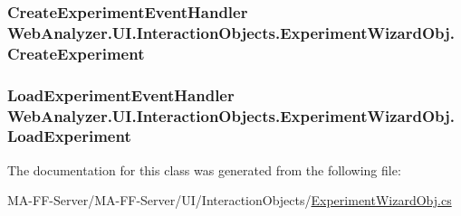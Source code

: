 \subsubsection[{Create\+Experiment}]{\setlength{\rightskip}{0pt plus 5cm}Create\+Experiment\+Event\+Handler Web\+Analyzer.\+U\+I.\+Interaction\+Objects.\+Experiment\+Wizard\+Obj.\+Create\+Experiment}\label{class_web_analyzer_1_1_u_i_1_1_interaction_objects_1_1_experiment_wizard_obj_a95676a614efb19092a4522290e47ef96}
\hypertarget{class_web_analyzer_1_1_u_i_1_1_interaction_objects_1_1_experiment_wizard_obj_a4ab54f4e59198b7ff3e9b91ad5049642}{}
\subsubsection[{Load\+Experiment}]{\setlength{\rightskip}{0pt plus 5cm}Load\+Experiment\+Event\+Handler Web\+Analyzer.\+U\+I.\+Interaction\+Objects.\+Experiment\+Wizard\+Obj.\+Load\+Experiment}\label{class_web_analyzer_1_1_u_i_1_1_interaction_objects_1_1_experiment_wizard_obj_a4ab54f4e59198b7ff3e9b91ad5049642}


The documentation for this class was generated from the following file\+:\begin{DoxyCompactItemize}
\item 
M\+A-\/\+F\+F-\/\+Server/\+M\+A-\/\+F\+F-\/\+Server/\+U\+I/\+Interaction\+Objects/\hyperlink{_experiment_wizard_obj_8cs}{Experiment\+Wizard\+Obj.\+cs}\end{DoxyCompactItemize}
